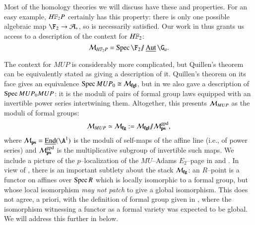 \begin{example}
Most of the homology theories we will discuss have these {\CH} and {\FH} properties.  For an easy example, $\HFtwo P$ certainly has this property: there is only one possible algebraic map $\F_2 \to \mathcal A_*$, so {\FH} is necessarily satisfied.  Our work in  thus grants us access to a description of the context for $\HFtwo$: \[\context{\HFtwo P} = \Spec \F_2 \mmod \InternalAut{\G_a}.\]
\end{example}

\begin{example}\label{ContextOfMUPExample}
The context for $MUP$ is considerably more complicated, but Quillen's theorem can be equivalently stated as giving a description of it.  Quillen's theorem on its face gives an equivalence $\operatorname{Spec} MUP_0 \cong \mathcal{M}_{\mathbf{fgl}}$, but in  we also gave a description of $\operatorname{Spec} MUP_0 MUP$: it is the moduli of pairs of formal group laws equipped with an invertible power series intertwining them.  Altogether, this presents $\mathcal{M}_{MUP}$ as the moduli of formal groups: \[\mathcal{M}_{MUP} \simeq \mathcal{M}_{\mathbf{fg}} := \mathcal{M}_{\mathbf{fgl}} /\!\!/ \mathcal{M}_{\mathbf{ps}}^{\mathrm{gpd}},\] where $\moduli{ps} = \InternalEnd(\A^1)$ is the moduli of self-maps of the affine line (i.e., of power series) and $\mathcal{M}_{\mathbf{ps}}^{\mathrm{gpd}}$ is the multiplicative subgroup of invertible such maps.  We include a picture of the $p$--localization of the $MU$--Adams $E_2$--page in  and .  In view of , there is an important subtlety about the stack $\mathcal{M}_{\mathbf{fg}}$: an $R$--point is a functor on affines over $\operatorname{Spec} R$ which is locally isomorphic to a formal group, but whose local isomorphism \emph{may not patch} to give a global isomorphism.  This does not agree, a priori, with the definition of formal group given in , where the isomorphism witnessing a functor as a formal variety was expected to be global.  We will address this further in  below.
\end{example}

